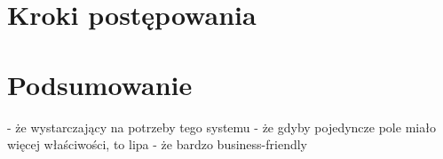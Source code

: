 \section{Kroki postępowania}



\section{Podsumowanie}

- że wystarczający na potrzeby tego systemu
- że gdyby pojedyncze pole miało więcej właściwości, to lipa
- że bardzo business-friendly
